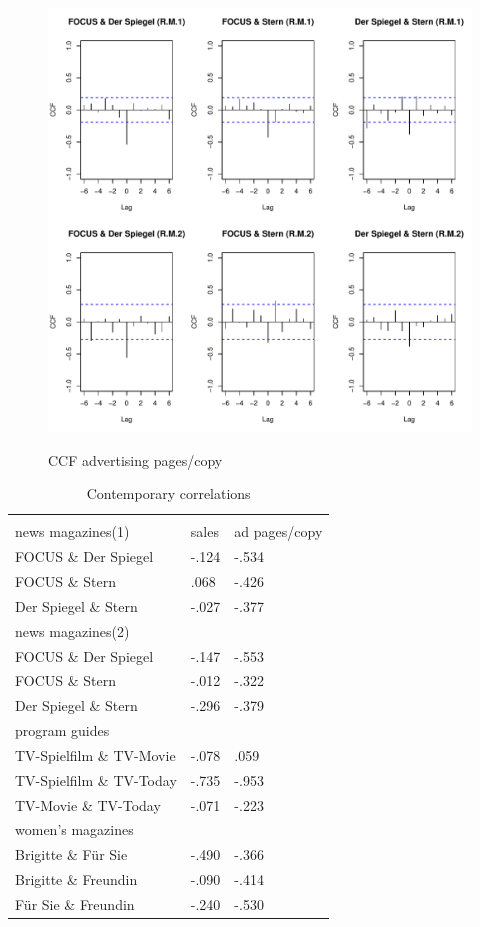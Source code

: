 \documentclass[12pt,a4paper,notitlepage]{article}
\begin{document}
\begin{figure}[H]
\caption{CCF advertising pages/copy}
	\centering
	\includegraphics[scale=0.5]{../figs/ccf_ads_fss}
	\label{fig_ccf_ads_fss}
\end{figure}

\begin{table}[!htbp] \centering
	\caption{Contemporary correlations}
	\label{tab_CCF}
\begin{tabular}{@{\extracolsep{5pt}} lll}
\\[-1.8ex]\hline 
\hline \\[-1.8ex]
	news magazines(1) & sales & ad pages/copy \\
	\hline
	FOCUS \& Der Spiegel & -.124 & -.534 \\
	FOCUS \& Stern & .068 & -.426 \\
	Der Spiegel \& Stern & -.027 & -.377 \\
	\hline
	news magazines(2) & & \\
	\hline
	FOCUS \& Der Spiegel & -.147 & -.553 \\
	FOCUS \& Stern & -.012 & -.322 \\
	Der Spiegel \& Stern & -.296 & -.379 \\
	\hline
	program guides & & \  \\ 
	\hline
	TV-Spielfilm \& TV-Movie & -.078 & .059 \\
	TV-Spielfilm \& TV-Today & -.735 & -.953 \\
	TV-Movie \& TV-Today & -.071 & -.223 \\ 
	\hline
	women's magazines &  & \  \\ 
	\hline
	Brigitte \& Für Sie & -.490 & -.366 \\ 
	Brigitte \& Freundin & -.090 & -.414 \\ 
	Für Sie \& Freundin & -.240 & -.530 \\ \hline
\end{tabular}
	\end{table}
\end{document}
